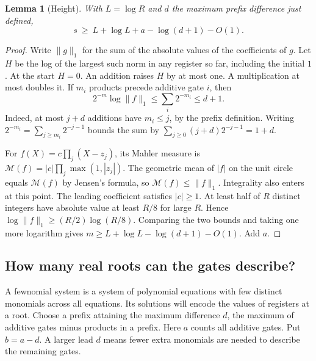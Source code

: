 \documentclass[11pt,letterpaper]{article}
\newtheorem{lemma}{Lemma}
\begin{document}
\begin{lemma}[Height]\label{lem:height}
With \(L=\log R\) and \(d\) the maximum prefix difference just defined,
\[
 s\ \ge\ L+\log L+a-\log(d+1)-O(1).
 \tag{H}\label{eq:H}
\]
\end{lemma}
\begin{proof}
Write \(\|g\|_1\) for the sum of the absolute values of the coefficients of
\(g\). Let \(H\) be the log of the largest such norm in any register so far,
including the initial \(1\). At the start \(H=0\). An addition raises \(H\)
by at most one. A multiplication at most doubles it. If \(m_i\) products
precede additive gate \(i\), then
\[
 2^{-m}\log\|f\|_1\le \sum_i2^{-m_i}\le d+1.
\]
Indeed, at most \(j+d\) additions have \(m_i\le j\), by the prefix
definition. Writing \(2^{-m_i}=\sum_{j\ge m_i}2^{-j-1}\) bounds the sum
by \(\sum_{j\ge0}(j+d)2^{-j-1}=1+d\).

For \(f(X)=c\prod_j(X-z_j)\), its Mahler measure is
\(\mathcal M(f)=|c|\prod_j\max(1,|z_j|)\).
The geometric mean of \(|f|\) on the unit circle equals \(\mathcal M(f)\)
by Jensen's formula, so \(\mathcal M(f)\le\|f\|_1\).
Integrality also enters at this point. The leading coefficient satisfies \(|c|\ge1\).
At least half of \(R\) distinct integers have absolute value at least
\(R/8\) for large \(R\). Hence \(\log\|f\|_1\ge (R/2)\log(R/8)\).
Comparing the two bounds and taking one more logarithm gives
\(m\ge L+\log L-\log(d+1)-O(1)\). Add \(a\).
\end{proof}

\clearpage
\subsection{How many real roots can the gates describe?}
A fewnomial system is a system of polynomial equations with few distinct
monomials across all equations. Its solutions will encode the values of
registers at a root. Choose a prefix attaining the maximum difference
\(d\), the maximum of additive gates minus products in a prefix.
Here \(a\) counts all additive gates. Put \(b=a-d\). A larger lead \(d\)
means fewer extra monomials are needed to describe the remaining gates.
\end{document}
